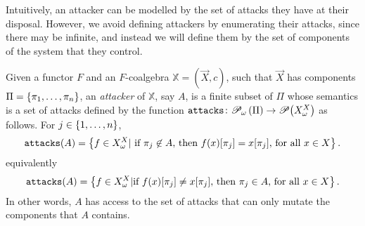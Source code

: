 Intuitively, an attacker can be modelled by the set of attacks they have at their disposal. However, we avoid defining attackers by enumerating their attacks, since there may be infinite, and instead we will define them by the set of components of the system that they control. 

\begin{definition}[Attacker]
Given a functor $F$ and an $F$-coalgebra $\mathbb{X}=(\vec{X},c)$, such that $\vec{X}$ has components $\Pi=\left\{\pi_1, \ldots, \pi_n\right\}$, an \emph{attacker} of $\mathbb{X}$, say $A$, is a {finite} subset of $\Pi$ whose semantics is a set of attacks defined by the function $\texttt{attacks}\colon {{{\mathscr{P}}_\omega}\left(\Pi\right)}\rightarrow{{\mathscr{P}}\!\left({X^X_\omega}\right)}$ as follows. 
For $j\in \left\{1, \ldots,  n\right\}$,  
\begin{align}
\texttt{attacks}(A)=\left\{f\in X^X_\omega | \text{ if $\pi_j \not\in A$, then $f(x)[\pi_j]=x[\pi_j]$, for all $x\in X$}\right\}.
\end{align}
{\color{red}
equivalently
\begin{align}
\texttt{attacks}(A)=\left\{f\in X^X_\omega | \text{if $f(x)[\pi_j]\neq x[\pi_j]$, then $\pi_j \in A$, for all $x\in X$}\right\}.
\end{align}
}
In other words, $A$ has access to the set of attacks that can only mutate the components that $A$ contains.
 \end{definition}
% 
%
